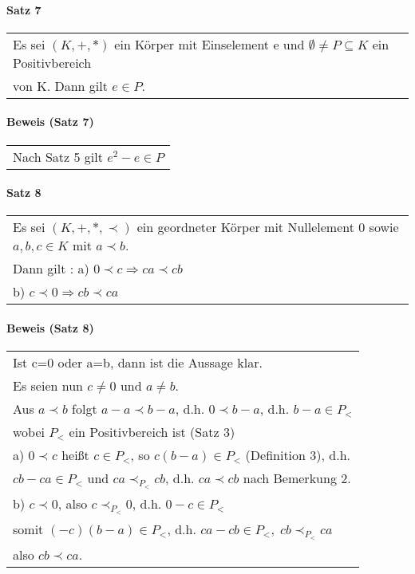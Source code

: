 \documentclass[a4paper]{scrartcl}
\begin{document}
\paragraph{Satz 7}
\begin{tabbing}
\begin{tabular}{l}
Es sei $(K,+,*)$ ein Körper mit Einselement e und $\emptyset\neq P\subseteq K$ ein Positivbereich\\
von K. Dann gilt $e\in P$.
\end{tabular}
\end{tabbing}

\paragraph{Beweis (Satz 7)}
\begin{tabbing}
\begin{tabular}{l}
Nach Satz 5 gilt $e^2-e\in P$
\end{tabular}
\end{tabbing}

\paragraph{Satz 8}
\begin{tabbing}
\begin{tabular}{l}
Es sei $(K,+,*,\prec)$ ein geordneter Körper mit Nullelement 0 sowie $a,b,c\in K$ mit $a\prec b$.\\
Dann gilt :
a) $0\prec c \Rightarrow ca \prec cb$\\
b) $c\prec 0 \Rightarrow cb \prec ca$
\end{tabular}
\end{tabbing}

\paragraph{Beweis (Satz 8)}
\begin{tabbing}
\begin{tabular}{l}
Ist c=0 oder a=b, dann ist die Aussage klar.\\
Es seien nun $c \neq 0$ und $a\neq b$.\\
Aus $a\prec b$ folgt $a-a\prec b-a$, d.h. $0\prec b-a$, d.h. $b-a\in P_<$\\
wobei $P_<$ ein Positivbereich ist (Satz 3)\\
a) $0\prec c$ heißt $c\in P_<$, so $c(b-a)\in P_<$ (Definition 3), d.h.\\
$cb-ca\in P_<$ und $ca \prec_{P_<} cb$, d.h. $ca \prec cb$ nach Bemerkung 2.\\
b) $c\prec 0$, also $c\prec_{P_<} 0$, d.h. $0-c\in P_<$\\
somit $(-c)(b-a)\in P_<$, d.h. $ca-cb\in P_<,\;cb\prec_{P_<} ca$\\
also $cb \prec ca$.
\end{tabular}
\end{tabbing}
\end{document}
